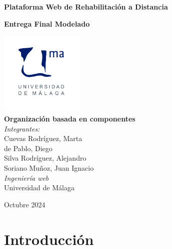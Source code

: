 \documentclass{article}
\begin{document}
	
	\begin{titlepage}
		\centering
		\vspace*{3cm}
		
		{\Huge \textbf{Plataforma Web de Rehabilitación a Distancia}\\[0.5cm]}
		
		{\Large \textbf{Entrega Final Modelado}\\[0.5cm]}
		
		\vspace{2cm}
		\includegraphics[width=0.3\textwidth]{images/uma_logo.jpg}\\[1cm]
		
		{\LARGE \textbf{Organización basada en componentes}\\[0.5cm]}
		{\large \textit{Integrantes:}\\
			Cuevas Rodríguez, Marta\\
			de Pablo, Diego\\
			Silva Rodríguez, Alejandro\\
			Soriano Muñoz, Juan Ignacio\\
		}
		\vfill
		{\large \textit{Ingeniería web}\\
			Universidad de Málaga\\
		}
		
		\vfill
		
		{\large Octubre 2024}
	\end{titlepage}
	
	\tableofcontents
	
	\newpage
	
	\section{Introducción}
\end{document}

